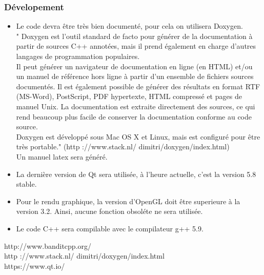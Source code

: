\documentclass[12pt]{article}
\begin{document}
			\subsubsection{Dévelopement}
				\begin{itemize}
					\item Le code devra être très bien documenté, pour cela on utilisera Doxygen.\\
						" Doxygen est l’outil standard de facto pour générer de la documentation à partir de sources C++ annotées, mais il prend également en charge d’autres langages de programmation	populaires.\\
						Il peut générer un navigateur de documentation en ligne (en HTML) et/ou un manuel de référence hors ligne à partir d’un ensemble de fichiers sources documentés. Il est également possible de générer des résultats en format RTF (MS-Word), PostScript, PDF hypertexte, HTML compressé et pages de manuel Unix. La documentation est extraite directement des sources, ce qui rend beaucoup plus facile de conserver la documentation conforme au code	source.\\
						Doxygen est développé sous Mac OS X et Linux, mais est configuré pour être très portable." (http ://www.stack.nl/ dimitri/doxygen/index.html)\\
						Un manuel latex sera généré.						
					
					\item La dernière version de Qt sera utilisée, à l'heure actuelle, c'est la version 5.8 stable.
					\item Pour le rendu graphique, la version d'OpenGL doit être superieure à la version 3.2. Ainsi, aucune fonction obsoléte ne sera utilisée.
					\item Le code C++ sera compilable avec le compilateur g++ 5.9.
				\end{itemize}

			\vspace*{\fill} 
			http://www.banditcpp.org/\\http ://www.stack.nl/ dimitri/doxygen/index.html\\ https://www.qt.io/
	\newpage

	
\end{document}
